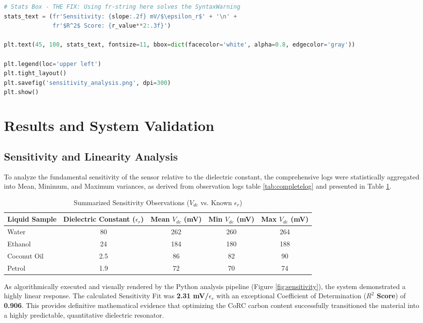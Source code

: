 \documentclass[11pt, a4paper]{article}
\begin{document}
\begin{lstlisting}[language=Python, caption={Python implementation for evaluating Sensor Sensitivity and Linearity Regression.}, label=lst:sense_analysis]
# Stats Box - THE FIX: Using fr-string here solves the SyntaxWarning
stats_text = (fr'Sensitivity: {slope:.2f} mV/$\epsilon_r$' + '\n' + 
              fr'$R^2$ Score: {r_value**2:.3f}')

plt.text(45, 100, stats_text, fontsize=11, bbox=dict(facecolor='white', alpha=0.8, edgecolor='gray'))

plt.legend(loc='upper left')
plt.tight_layout()
plt.savefig('sensitivity_analysis.png', dpi=300)
plt.show()
\end{lstlisting}

\vspace*{14pt}
\section{Results and System Validation}

\subsection{Sensitivity and Linearity Analysis}
To analyze the fundamental sensitivity of the sensor relative to the dielectric constant, the comprehensive logs were statistically aggregated into Mean, Minimum, and Maximum variances, as derived from observation logs table \ref{tab:completelog} and presented in Table \ref{tab:summarylog}.

\begin{table}[H]
\centering
\caption{Summarized Sensitivity Observations ($V_{dc}$ vs. Known $\epsilon_r$)}
\label{tab:summarylog}
\begin{tabular}{|l|c|c|c|c|}
\hline
\textbf{Liquid Sample} & \textbf{Dielectric Constant ($\epsilon_r$)} & \textbf{Mean $V_{dc}$ (mV)} & \textbf{Min $V_{dc}$ (mV)} & \textbf{Max $V_{dc}$ (mV)} \\ \hline
Water & 80 & 262 & 260 & 264 \\ \hline
Ethanol & 24 & 184 & 180 & 188 \\ \hline
Coconut Oil & 2.5 & 86 & 82 & 90 \\ \hline
Petrol & 1.9 & 72 & 70 & 74 \\ \hline
\end{tabular}
\end{table}

\newpage
As algorithmically executed and visually rendered by the Python analysis pipeline (Figure \ref{fig:sensitivity}), the system demonstrated a highly linear response. The calculated Sensitivity Fit was \textbf{2.31 mV/$\epsilon_r$} with an exceptional Coefficient of Determination (\textbf{$R^2$ Score}) of \textbf{0.906}. This provides definitive mathematical evidence that optimizing the CoRC carbon content successfully transitioned the material into a highly predictable, quantitative dielectric resonator.
\end{document}
